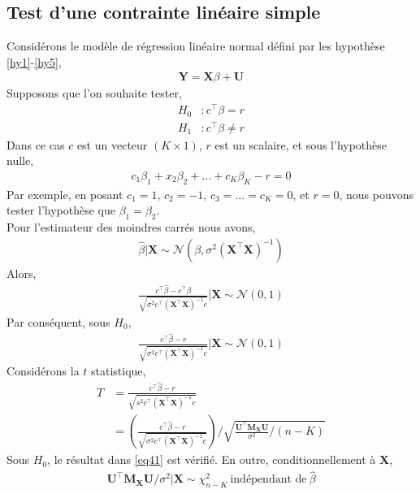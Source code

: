\subsection{Test d'une contrainte linéaire simple}
Considérons le modèle de régression linéaire normal défini par les hypothèse \ref{hy1}-\ref{hy5},
\begin{align*}
\mathbf{Y} = \mathbf{X}\beta + \mathbf{U}
\end{align*}
Supposons que l'on souhaite tester,
\begin{align*}
H_0&: c^\top\beta=r\\
H_1&: c^\top\beta \neq r
\end{align*}
Dans ce cas $c$ est un vecteur $(K\times 1)$, $r$ est un scalaire, et sous l'hypothèse nulle,
\begin{align*}
c_1\beta_1 + x_2\beta_2+...+c_K\beta_K-r=0
\end{align*}
Par exemple, en posant $c_1 = 1$, $c_2=-1$, $c_3 = ...=c_K = 0$, et $r = 0$, nous pouvons tester l'hypothèse que $\beta_1=\beta_2$.\\
Pour l'estimateur des moindres carrés nous avons,
\begin{align}
\widehat{\beta}|\mathbf{X} \sim \mathcal{N}\left(\beta, \sigma^2(\mathbf{X}^\top\mathbf{X})^{-1}\right)
\label{eq39}
\end{align} 
Alors,
\begin{align}
\frac{c^\top\widehat{\beta} - c^\top\beta}{\sqrt{\sigma^2c^\top(\mathbf{X}^\top\mathbf{X})^{-1}c}}
| \mathbf{X} \sim \mathcal{N}(0, 1)
\label{eq40}
\end{align} 
Par conséquent, sous $H_0$,
\begin{align}
\frac{c^\top\widehat{\beta} - r}
{\sqrt{\sigma^2c^\top(\mathbf{X}^\top\mathbf{X})^{-1}c}}
| \mathbf{X} \sim \mathcal{N}(0, 1)
\label{eq41}
\end{align} 
Considérons la $t$ statistique,
\begin{align*}
T &= \frac{c^\top\widehat{\beta} - r}
{\sqrt{s^2c^\top(\mathbf{X}^\top\mathbf{X})^{-1}c}}\\
&=\left(
\frac{c^\top\widehat{\beta} - r}
{\sqrt{\sigma^2c^\top(\mathbf{X}^\top\mathbf{X})^{-1}c}}
\right)
/
\sqrt{\frac{\mathbf{U}^\top\mathbf{M}_\mathbf{X}\mathbf{U}}{\sigma^2}/(n-K)}
\end{align*}
Sous $H_0$, le résultat dans \eqref{eq41} est vérifié. En outre, conditionnellement à $\mathbf{X}$,
\begin{align}
\mathbf{U}^\top\mathbf{M}_\mathbf{X}\mathbf{U}/\sigma^2 | \mathbf{X}\sim \chi^2_{n-K} \ \textrm{indépendant de}  \ \widehat{\beta} 
\label{eq42}
\end{align}
